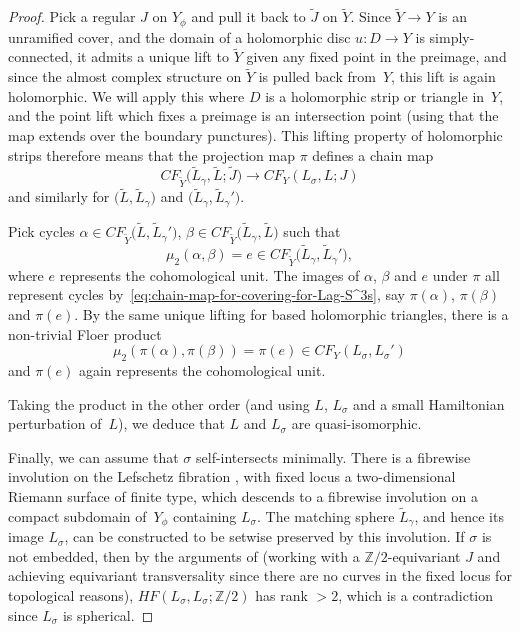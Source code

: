 \documentclass[10pt,a4paper]{amsart}
\def\bZ{\mathbb{Z}}
\theoremstyle{definition}
\numberwithin{equation}{section}
\begin{document}
\begin{proof}
Pick a regular $J$ on $ Y_{\phi}$ and pull it back to $\tilde{J}$ on $\tilde{Y}$. Since $\tilde{Y} \to Y$ is an unramified cover, and the domain of a holomorphic disc $u\colon D \to Y$ is simply-connected, it admits a unique lift to $\tilde{Y}$ given any fixed point in the preimage, and since the almost complex structure on $\tilde{Y}$ is pulled back from~$Y$, this lift is again holomorphic. We will apply this where $D$ is a holomorphic strip or triangle in~$Y$, and the point lift which fixes a preimage is an intersection point (using that the map extends over the boundary punctures). This lifting property of holomorphic strips therefore means that the projection map $\pi$ defines a chain map
\begin{equation} \label{eq:chain-map-for-covering-for-Lag-S^3s}
 {CF}_{\tilde{Y}} \bigl(\tilde{L}_\gamma, \tilde{L}; \tilde{J}\bigr) \to {CF}_Y (L_\sigma, L; J)
\end{equation}
and similarly for $\bigl(\tilde{L}, \tilde{L}_\gamma\bigr) $ and $\bigl(\tilde{L}_\gamma, \tilde{L}_\gamma'\bigr)$.

Pick cycles $\alpha \in {CF}_{\tilde{Y}} \bigl(\tilde{L}, \tilde{L}_\gamma' \bigr) $, $\beta \in {CF}_{\tilde{Y}} \bigl(\tilde{L}_\gamma, \tilde{L}\bigr) $ such that
\begin{equation*}
 \mu_2 (\alpha, \beta) = e \in {CF}_{\tilde{Y}} \bigl(\tilde{L}_\gamma, \tilde{L}_\gamma'\bigr),
\end{equation*}
where $e$ represents the cohomological unit. The images of $\alpha$, $\beta$ and $e$ under $\pi$ all represent cycles by~\eqref{eq:chain-map-for-covering-for-Lag-S^3s}, say $\pi(\alpha)$, $\pi(\beta)$ and $\pi(e)$. By the same unique lifting for based holomorphic triangles,
there is a non-trivial Floer product
\begin{equation*}
 \mu_2 (\pi(\alpha), \pi(\beta)) = \pi(e) \in {CF}_{Y} (L_\sigma, L_\sigma')
\end{equation*}
and $\pi(e)$ again represents the cohomological unit.

Taking the product in the other order (and using $L$, $L_\sigma$ and a small Hamiltonian perturbation of~$L$), we deduce that $L$ and $L_\sigma$ are quasi-isomorphic.

Finally, we can assume that $\sigma$ self-intersects minimally. There is a fibrewise involution on the Lefschetz fibration , with fixed locus a two-dimensional Riemann surface of finite type, which descends to a fibrewise involution on a compact subdomain of~$Y_{\phi}$ containing $L_{\sigma}$. The matching sphere $\tilde{L}_{\gamma}$, and hence its image $L_{\sigma}$, can be constructed to be setwise preserved by this involution. If $\sigma$ is not embedded, then by the arguments of \cite[Section~5]{Khovanov-Seidel} (working with a $\bZ/2$-equivariant $J$ and achieving equivariant transversality since there are no curves in the fixed locus for topological reasons), $HF(L_{\sigma},L_{\sigma};\bZ/2)$ has rank $>2$, which is a contradiction since $L_{\sigma}$ is spherical.
\end{proof}
\end{document}
